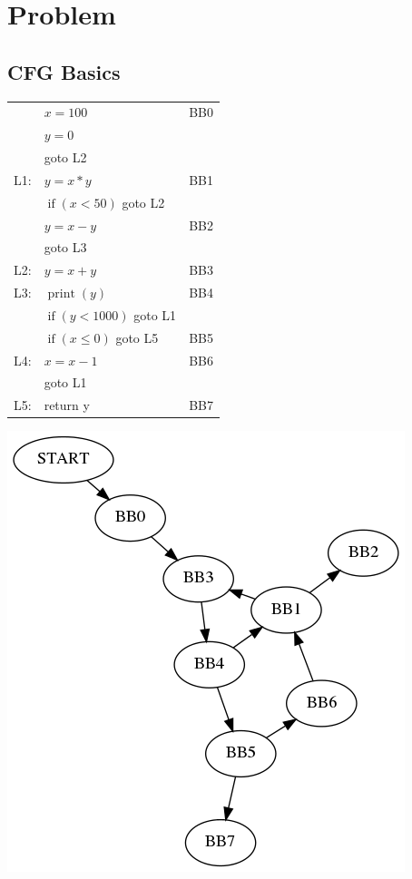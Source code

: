 \documentclass[12pt]{article}
\author{}
\title{}
\begin{document}
\maketitle

\section{Problem}
\subsection{CFG Basics}
\begin{tabular}{| l l| l}
  \cline{0-1}
  & $x = 100$ & BB0 \\
  & $y = 0$ &  \\
  & goto L2 &  \\
  \cline{0-1}
  L1: & $y = x * y$ & BB1 \\
  & $ \operatorname{if}(x < 50 )$ goto L2 &  \\
  \cline{0-1}
  & $y = x - y$ &  BB2\\
  & goto L3 & \\
  \cline{0-1}
  L2: & $y = x + y$ & BB3 \\
  \cline{0-1}
  L3: & $\operatorname{print}(y)$ & BB4 \\
  & $ \operatorname{if}(y < 1000 )$ goto L1 &  \\
  \cline{0-1}
  & $ \operatorname{if}(x \le 0 )$ goto L5 & BB5  \\
  \cline{0-1}
  L4: & $x = x-1$ & BB6 \\
  & goto L1 & \\
  \cline{0-1}
  L5: & return y & BB7 \\
  \cline{0-1}

\end{tabular}

\includegraphics{prob_51_cfg.png}
\end{document}
